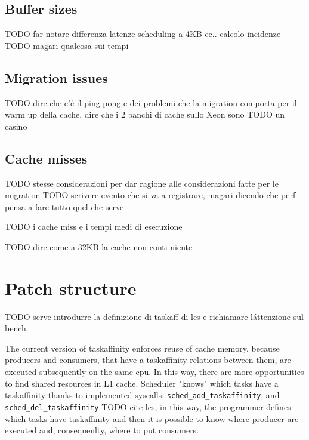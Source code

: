 \subsection{Buffer sizes}

TODO far notare differenza latenze scheduling a 4KB ec.. calcolo incidenze
TODO magari qualcosa sui tempi 

\subsection{Migration issues}
TODO dire che c'\'e il ping pong e dei problemi che la migration comporta per il warm up della cache, dire che i 2 banchi di cache sullo Xeon sono
TODO un casino

\subsection{Cache misses}

TODO stesse considerazioni per dar ragione alle considerazioni fatte per le migration
TODO scrivere evento che si va a registrare, magari dicendo che perf pensa a fare tutto quel che serve 

TODO i cache miss e i tempi medi di esecuzione

TODO dire come a 32KB la cache non conti niente

\section{Patch structure}

TODO serve introdurre la definizione di taskaff di lcs e richiamare l\'attenzione sul bench


The current version of taskaffinity enforces reuse of cache memory, because producers and consumers, that have a taskaffinity relations between them, are 
executed subsequently on the same cpu. In this way, there are more opportunities to find shared resources in L1 cache. Scheduler "knows" which tasks have a 
taskaffinity thanks to implemented syscalls: \texttt{sched\_add\_taskaffinity}, and \texttt{sched\_del\_taskaffinity} TODO cite lcs, in this way, the 
programmer defines which tasks have taskaffinity and then it is possible to know where producer are executed and, consequenlty, where to put consumers.

